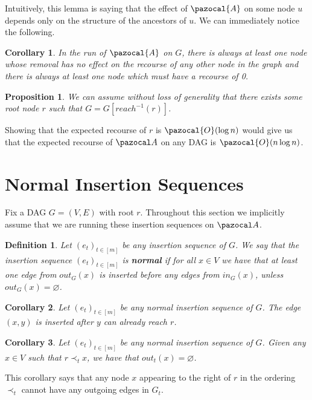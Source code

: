 \documentclass{article}
\newtheorem{corollary}{Corollary}
\newtheorem{proposition}{Proposition}
\newtheorem{definition}{Definition}
\begin{document}
Intuitively, this lemma is saying that the effect of $\pazocal{A}$ on some node $u$ depends only on the structure of the ancestors of $u$. We can immediately notice the following.

\begin{corollary}
In the run of $\pazocal{A}$ on $G$, there is always at least one node whose removal has no effect on the recourse of any other node in the graph and there is always at least one node which must have a recourse of 0.
\end{corollary}

\begin{proposition}
We can assume without loss of generality that there exists some root node $r$ such that $G = G[reach^{-1}(r)]$.
\end{proposition}

Showing that the expected recourse of $r$ is $\pazocal{O}(\log n)$ would give us that the expected recourse of $\pazocal A$ on any DAG is $\pazocal{O}(n \log n)$. 

\section{Normal Insertion Sequences}

Fix a DAG $G=(V,E)$ with root $r$. Throughout this section we implicitly assume that we are running these insertion sequences on $\pazocal A$.

\begin{definition}
Let $(e_t)_{t \in [m]}$ be any insertion sequence of $G$. We say that the insertion sequence $(e_t)_{t \in [m]}$ is \textbf{normal} if for all $x \in V$ we have that at least one edge from $out_G(x)$ is inserted before any edges from $in_G(x)$, unless $out_G(x) = \varnothing$.
\end{definition}

\begin{corollary}
Let $(e_t)_{t \in [m]}$ be any normal insertion sequence of $G$. The edge $(x,y)$ is inserted after $y$ can already reach $r$.
\end{corollary}

\begin{corollary}
Let $(e_t)_{t \in [m]}$ be any normal insertion sequence of $G$. Given any $x \in V$ such that $r \prec_t x$, we have that $out_t(x) = \varnothing$.
\end{corollary}

This corollary says that any node $x$ appearing to the right of $r$ in the ordering $\prec_t$ cannot have any outgoing edges in $G_t$.
\end{document}
